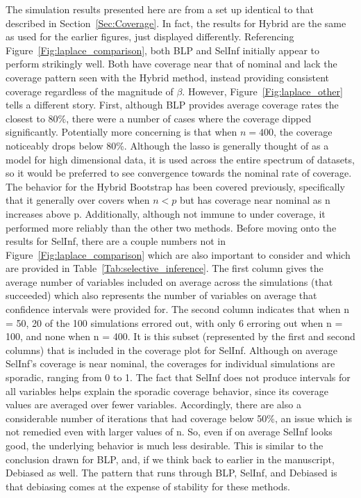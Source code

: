 The simulation results presented here are from a set up identical to that described in Section~\ref{Sec:Coverage}. In fact, the results for Hybrid are the same as used for the earlier figures, just displayed differently. Referencing Figure~\ref{Fig:laplace_comparison}, both BLP and SelInf initially appear to perform strikingly well. Both have coverage near that of nominal and lack the coverage pattern seen with the Hybrid method, instead providing consistent coverage regardless of the magnitude of $\beta$. However, Figure~\ref{Fig:laplace_other} tells a different story. First, although BLP provides average coverage rates the closest to $80\%$, there were a number of cases where the coverage dipped significantly. Potentially more concerning is that when $n = 400$, the coverage noticeably drops below 80\%. Although the lasso is generally thought of as a model for high dimensional data, it is used across the entire spectrum of datasets, so it would be preferred to see convergence towards the nominal rate of coverage. The behavior for the Hybrid Bootstrap has been covered previously, specifically that it generally over covers when $n < p$ but has coverage near nominal as n increases above p. Additionally, although not immune to under coverage, it performed more reliably than the other two methods. Before moving onto the results for SelInf, there are a couple numbers not in Figure~\ref{Fig:laplace_comparison} which are also important to consider and which are provided in Table~\ref{Tab:selective_inference}. The first column gives the average number of variables included on average across the simulations (that succeeded) which also represents the number of variables on average that confidence intervals were provided for. The second column indicates that when n = 50, 20 of the 100 simulations errored out, with only 6 erroring out when n = 100, and none when n = 400. It is this subset (represented by the first and second columns) that is included in the coverage plot for SelInf. Although on average SelInf's coverage is near nominal, the coverages for individual simulations are sporadic, ranging from 0 to 1. The fact that SelInf does not produce intervals for all variables helps explain the sporadic coverage behavior, since its coverage values are averaged over fewer variables. Accordingly, there are also a considerable number of iterations that had coverage below 50\%, an issue which is not remedied even with larger values of n. So, even if on average SelInf looks good, the underlying behavior is much less desirable. This is similar to the conclusion drawn for BLP, and, if we think back to earlier in the manuscript, Debiased as well. The pattern that runs through BLP, SelInf, and Debiased is that debiasing comes at the expense of stability for these methods.

